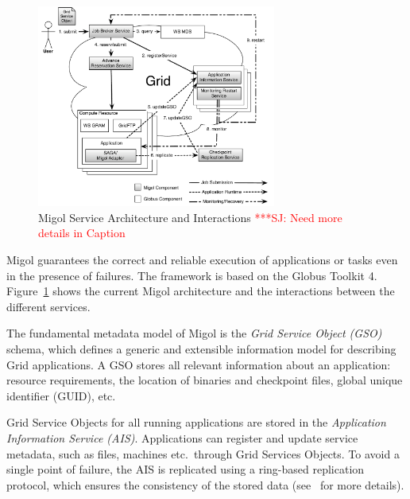 \documentclass[times, 10pt,twocolumn]{article}
\newcommand{\jhanote}[1]{ {\textcolor{red} { ***SJ: #1 }}}
\begin{document}
\label{sec:migol}

\begin{figure}[t]
            \centering
                \includegraphics[width=0.7\textwidth]{migol_architecture}
            \caption{Migol Service Architecture and Interactions \jhanote{Need more details in  Caption} }
            \label{fig:migol_architecture} 
\end{figure}           


Migol guarantees the correct and reliable exe\-cution of applications or tasks even in
the presence of  failures. The framework is based on the Globus Toolkit 4. 
Figure~\ref{fig:migol_architecture} shows the current Migol architecture and 
the interactions between the different services.

The fundamental metadata model of Migol is the \emph{Grid Service Object (GSO)} schema,
which defines a generic and extensible information model for
describing Grid applications.  
A GSO stores all relevant information about an application: resource requirements,
the location of binaries and checkpoint files, global unique identifier (GUID),
etc.

Grid Service Objects for all running applications are stored in 
the {\em Application Information Service (AIS)}. 
Applications can register and update service metadata, 
such as files, machines etc.\ through Grid Services Objects. 
To avoid a single point of failure, the AIS is replicated using a ring-based
replication protocol, which ensures  the consistency of the stored data
(see~\cite{Luckow:2008ys} for more details).
\end{document}
